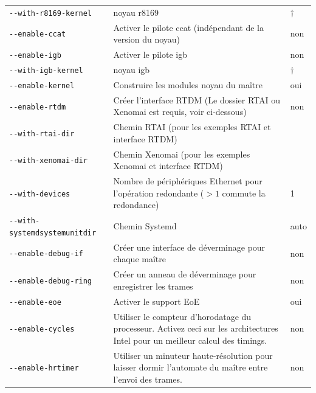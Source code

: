 \documentclass[a4paper,12pt,BCOR6mm,bibtotoc,idxtotoc]{scrbook}
\begin{document}
\begin{longtable}{l|p{}|l}
\lstinline+--with-r8169-kernel+ & noyau r8169 & $\dagger$\\

\lstinline+--enable-ccat+ & Activer le pilote ccat (ind\'ependant de
la version du noyau) & non\\

\lstinline+--enable-igb+ & Activer le pilote igb & non\\

\lstinline+--with-igb-kernel+ & noyau igb & $\dagger$\\

\hline

\lstinline+--enable-kernel+ & Construire les modules noyau du ma\^itre
& oui\\

\lstinline+--enable-rtdm+ & Cr\'eer l'interface RTDM (Le dossier RTAI
ou Xenomai est requis, voir ci-dessous) & non\\

\lstinline+--with-rtai-dir+ & Chemin RTAI (pour les exemples RTAI et
interface RTDM) & \\

\lstinline+--with-xenomai-dir+ & Chemin Xenomai (pour les exemples
Xenomai et interface RTDM) & \\

\lstinline+--with-devices+ & Nombre de p\'eriph\'eriques Ethernet pour
l'op\'eration redondante ($>1$ commute la redondance) & 1\\

\lstinline+--with-systemdsystemunitdir+ & Chemin Systemd & auto \\

\lstinline+--enable-debug-if+ & Cr\'eer une interface de d\'everminage pour
chaque ma\^itre & non\\

\lstinline+--enable-debug-ring+ & Cr\'eer un anneau de d\'everminage pour
enregistrer les trames & non\\

\lstinline+--enable-eoe+ & Activer le support EoE & oui\\

\lstinline+--enable-cycles+ & Utiliser le compteur d'horodatage du
processeur. Activez ceci sur les architectures Intel pour un meilleur
calcul des timings. & non\\

\lstinline+--enable-hrtimer+ & Utiliser un minuteur haute-r\'esolution
pour laisser dormir l'automate du ma\^itre entre l'envoi des trames. &
non\\


\end{longtable}
\end{document}

